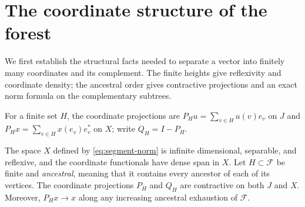 \section{The coordinate structure of the forest}\label{sec:forest}

We first establish the structural facts needed to separate a vector
into finitely many coordinates and its complement. The finite heights
give reflexivity and coordinate density; the ancestral order gives
contractive projections and an exact norm formula on the complementary
subtrees.

For a finite set $H$, the coordinate projections are
$P_Hu=\sum_{v\in H}u(v)e_v$ on $J$ and
$P_Hx=\sum_{v\in H}x(e_v)e_v^*$ on $X$; write $Q_H=I-P_H$.

\begin{lemma}\label{lem:forest-structure}
The space $X$ defined by \eqref{eq:segment-norm} is infinite dimensional,
separable, and reflexive, and the coordinate functionals have dense span
in $X$. Let $H\subset\mathcal F$ be finite and \emph{ancestral}, meaning
that it contains every ancestor of each of its vertices. The coordinate
projections $P_H$ and $Q_H$ are contractive on both $J$ and $X$.
Moreover, $P_Hx\to x$ along any increasing ancestral exhaustion of
$\mathcal F$.
\end{lemma}

